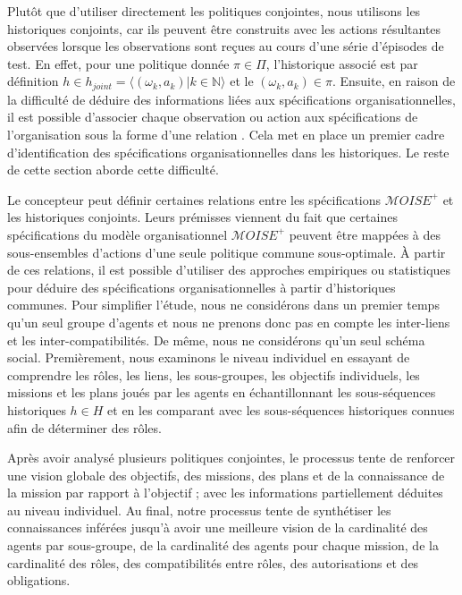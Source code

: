 \documentclass[contribution]{jfsma}
\newcounter{relation}
\begin{document}
Plutôt que d'utiliser directement les politiques conjointes, nous utilisons les historiques conjoints, car ils peuvent être construits avec les actions résultantes observées lorsque les observations sont reçues au cours d'une série d'épisodes de test. En effet, pour une politique donnée $\pi \in \Pi$, l'historique associé est par définition $h \in h_{joint} = \langle(\omega_k,a_k) | k \in \mathbb{N}\rangle$ et le $(\omega_k,a_k) \in \pi$.
Ensuite, en raison de la difficulté de déduire des informations liées aux spécifications organisationnelles, il est possible d'associer chaque observation ou action aux spécifications de l'organisation sous la forme d'une relation . Cela met en place un premier cadre d’identification des spécifications organisationnelles dans les historiques. Le reste de cette section aborde cette difficulté.

Le concepteur peut définir certaines relations entre les spécifications $\mathcal{M}OISE^+$ et les historiques conjoints. Leurs prémisses viennent du fait que certaines spécifications du modèle organisationnel $\mathcal{M}OISE^+$ peuvent être mappées à des sous-ensembles d'actions d'une seule politique commune sous-optimale.
À partir de ces relations, il est possible d’utiliser des approches empiriques ou statistiques pour déduire des spécifications organisationnelles à partir d’historiques communes.
Pour simplifier l'étude, nous ne considérons dans un premier temps qu'un seul groupe d'agents et nous ne prenons donc pas en compte les inter-liens et les inter-compatibilités. De même, nous ne considérons qu’un seul schéma social.
Premièrement, nous examinons le niveau individuel en essayant de comprendre les rôles, les liens, les sous-groupes, les objectifs individuels, les missions et les plans joués par les agents en échantillonnant les sous-séquences historiques $h \in H$ et en les comparant avec les sous-séquences historiques connues afin de déterminer des rôles.

Après avoir analysé plusieurs politiques conjointes, le processus tente de renforcer une vision globale des objectifs, des missions, des plans et de la connaissance de la mission par rapport à l'objectif ; avec les informations partiellement déduites au niveau individuel.
Au final, notre processus tente de synthétiser les connaissances inférées jusqu'à avoir une meilleure vision de la cardinalité des agents par sous-groupe, de la cardinalité des agents pour chaque mission, de la cardinalité des rôles, des compatibilités entre rôles, des autorisations et des obligations.
\end{document}
